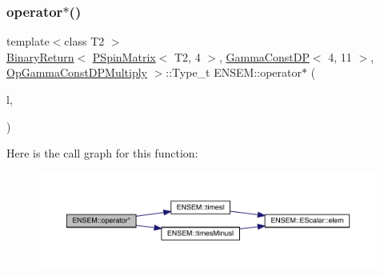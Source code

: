 \subsubsection{\texorpdfstring{operator$\ast$()}{operator*()}\hspace{0.1cm}{\footnotesize\ttfamily [60/64]}}
{\footnotesize\ttfamily template$<$class T2 $>$ \\
\mbox{\hyperlink{structENSEM_1_1BinaryReturn}{Binary\+Return}}$<$ \mbox{\hyperlink{classENSEM_1_1PSpinMatrix}{P\+Spin\+Matrix}}$<$ T2, 4 $>$, \mbox{\hyperlink{classENSEM_1_1GammaConstDP}{Gamma\+Const\+DP}}$<$ 4, 11 $>$, \mbox{\hyperlink{structENSEM_1_1OpGammaConstDPMultiply}{Op\+Gamma\+Const\+D\+P\+Multiply}} $>$\+::Type\+\_\+t E\+N\+S\+E\+M\+::operator$\ast$ (\begin{DoxyParamCaption}\item[{const \mbox{\hyperlink{classENSEM_1_1PSpinMatrix}{P\+Spin\+Matrix}}$<$ T2, 4 $>$ \&}]{l,  }\item[{const \mbox{\hyperlink{classENSEM_1_1GammaConstDP}{Gamma\+Const\+DP}}$<$ 4, 11 $>$ \&}]{ }\end{DoxyParamCaption})\hspace{0.3cm}{\ttfamily [inline]}}

Here is the call graph for this function\+:\nopagebreak
\begin{figure}[H]
\begin{center}
\leavevmode
\includegraphics[width=350pt]{d6/df5/group__primspinmatrix_gafdfa5cea94c5b8301c476e73bf94071c_cgraph}
\end{center}
\end{figure}
\mbox{\label{group__primspinmatrix_ga554a403dc2f232b906a5f7a9971eced3}} 
